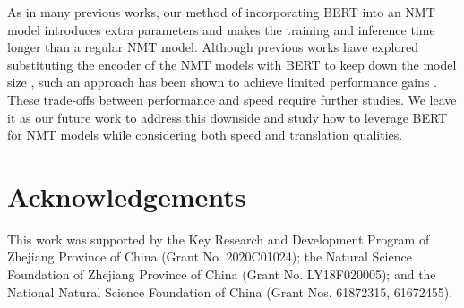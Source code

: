 \documentclass[review]{elsarticle}
\begin{document}
As in many previous works, our method of incorporating BERT into an NMT model introduces extra parameters and makes the training and inference time longer than a regular NMT model. 
Although previous works have explored substituting the encoder of the NMT models with BERT to keep down the model size \cite{Imamura19}, such an approach has been shown to achieve limited performance gains \cite{Zhu20}.
These trade-offs between performance and speed require further studies.
We leave it as our future work to address this downside and study how to leverage BERT for NMT models while considering both speed and translation qualities.

\section*{Acknowledgements}
This work was supported by the Key Research and Development Program of Zhejiang Province of China (Grant No. 2020C01024); the Natural Science Foundation of Zhejiang Province of China (Grant No. LY18F020005); and the National Natural Science Foundation of China (Grant Nos. 61872315, 61672455).



\end{document}
